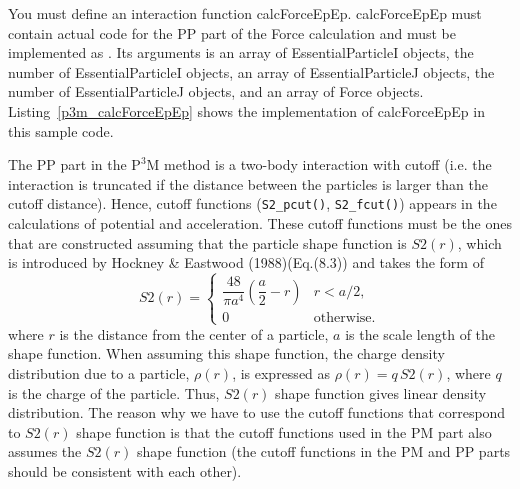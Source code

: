  \label{subsubsubsec:p3m_calcForceEpEp}
You must define an interaction function \textsf{calcForceEpEp}. \textsf{calcForceEpEp} must contain actual code for the PP part of the Force calculation and must be implemented as \procedure {}. Its arguments is an array of \textsf{EssentialParticleI} objects, the number of \textsf{EssentialParticleI} objects, an array of \textsf{EssentialParticleJ} objects, the number of \textsf{EssentialParticleJ} objects, and an array of \textsf{Force} objects. Listing~\ref{p3m_calcForceEpEp} shows the implementation of \textsf{calcForceEpEp} in this sample code.  

\ifCpp

\endifCpp
\ifFtn

\endifFtn
\ifC

\endifC


The PP part in the $\mathrm{P^{3}M}$ method is a two-body interaction with cutoff (i.e. the interaction is truncated if the distance between the particles is larger than the cutoff distance). Hence, cutoff functions (\texttt{S2\_pcut()}, \texttt{S2\_fcut()}) appears in the calculations of potential and acceleration. These cutoff functions must be the ones that are constructed assuming that the particle shape function is $S2(r)$, which is introduced by Hockney \& Eastwood (1988)(Eq.(8.3)) and takes the form of 
\begin{equation}
S2(r) = \left\{
\begin{array}{ll}
\dfrac{48}{\pi a^{4}}\left(\dfrac{a}{2}-r\right) & r < a/2, \\
0 & \mathrm{otherwise}.
\end{array}
\right.
\end{equation}
where $r$ is the distance from the center of a particle, $a$ is the scale length of the shape function. When assuming this shape function, the charge density distribution due to a particle, $\rho(r)$, is expressed as $\rho(r)=q\,S2(r)$, where $q$ is the charge of the particle. Thus, $S2(r)$ shape function gives linear density distribution. The reason why we have to use the cutoff functions that correspond to $S2(r)$ shape function is that the cutoff functions used in the PM part also assumes the $S2(r)$ shape function (the cutoff functions in the PM and PP parts should be consistent with each other).

